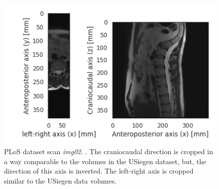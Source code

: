 \begin{figure}
    \centering
    \includegraphics[width=.95\textwidth]{automated_graphs/PLoS_img02.png}
    \caption{
        PLoS dataset scan \textit{img02}. \label{fig:PLoS_img02}. The craniocaudal direction is cropped in a way comparable to the volumes in the USiegen dataset, but, the direction of this axis is inverted.
        The left-right axis is cropped similar to the USiegen data volumes.
    }
\end{figure}